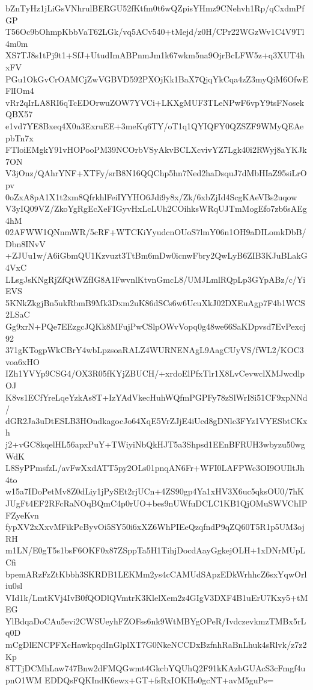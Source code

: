 bZnTyHz1jLiGsVNhrulBERGU52fKtfm0t6wQZpisYHmz9CNehvh1Rp/qCxdmPfGP
T56Oc9bOhmpKbbVaT62LGk/vq5ACv540+tMejd/z0H/CPr22WGzWv1C4V9Tl4m0m
XS7TJ8s1tPj9t1+SfJ+UtudImABPnmJm1k67wkm5na9OjrBcLFW5z+q3XUT4hxFV
PGu1OkGvCrOAMCjZwVGBVD592PXOjKk1BaX7QjqYkCqa4zZ3myQiM6OfwEFlIOm4
vRr2qIrLA8RI6qTcEDOrwuZOW7YVCi+LKXgMUF3TLeNPwF6vpY9tsFNosekQBX57
e1vd7YE8Bxeq4X0n3ExruEE+3meKq6TY/oT1q1QYIQFY0QZSZF9WMyQEAepbTn7x
FTloiEMgkY91vHOPooPM39NCOrbVSyAkvBCLXcvivYZ7Lgk40i2RWyj8aYKJk7ON
V3jOnz/QAhrYNF+XTFy/srB8N16QQChp5hn7Ned2haDsquJ7dMbHIaZ95siLrOpv
0oZxA8pA1X1t2xm8QfrkhlFeiIYYHO6Jdi9y8x/Zk/6xbZjId4ScgKAeVBs2uqow
V3yIQ09VZ/ZkoYgRgEcXeFIGyvHxLcLUh2COihksWRqUJTmMogEfo7zb6sAEg4hM
02AFWW1QNnmWR/5cRF+WTCKiYyudcnOUoS7lmY06n1OH9aDILomkDbB/Dbn8INvV
+ZJUu1w/A6iGbmQU1Kzvuzt3TtBm6mDw0icnwFbry2QwLyB6ZIB3KJuBLakG4VxC
LLsgJsKNgRjZfQtWZfIG8A1FwvnlKtvnGmcL8/UMJLmlRQpLp3GYpABz/c/YiEVS
5KNkZkgjBn5ukRbmB9Mk3Dxm2uK86dSCs6w6UcuXkJ02DXEuAgp7F4b1WCS2LSaC
Gg9xrN+PQe7EEzgcJQKk8MFujPwCSlpOWvVopq0g48we66SaKDpvsd7EvPexcj92
371gKTogpWkCBrY4wbLpzsoaRALZ4WURNENAgL9AagCUyVS/fWL2/KOC3voa6xHO
IZh1YVYp9CSG4/OX3R05fKYjZBUCH/+xrdoElPfxTlr1X8LvCevwclXMJwcdlpOJ
K8vs1ECfYreLqeYzkAs8T+IzYAdVkecHuhWQfmPGPFy78zSlWrI8i51CF9xpNNd/
dGR2Ja3uDtESLB3HOndkagocJo64XqE5VrZJjE4iUcd8gDNlc3FYz1VYESbtCKxh
j2+vGC8kqelHL56apxPuY+TWiyiNbQkHJT5a3Shpsd1EEnBFRUH3wbyzu50wgWdK
L8SyPPmsfzL/avFwXxdATT5py2OLs01pnqAN6Fr+WFI0LAFPWc3OI9OUIltJh4to
w15a7IDoPetMv8Z0dLiy1jPySEt2rjUCn+4ZS90gp4Ya1xHV3X6uc5qksOU0/7hK
JUgFt4EF2RFcRaNOqBQmC4p0rUO+bes9nUWfuDCLC1KB1QjOMuSWVChIPFZyeKvn
fypXV2xXxvMFikPcByvOi5SY50i6xXZ6WhPIEeQzqfndP9qZQ60T5R1p5UM3ojRH
m1LN/E0gT5s1bsF6OKF0x87ZSppTa5H1TihjDocdAayGgkejOLH+1xDNrMUpLCfi
bpemARzFzZtKbbh3SKRDB1LEKMm2ys4cCAMUdSApzEDkWrhhcZ6sxYqwOrliu0sl
VId1k/LmtKVj4IvB0fQODlQVmtrK3KlelXem2z4GIgV3DXF4B1uErU7Kxy5+tMEG
YlBdqaDoCAu5evi2CWSUeyhFZOFss6nk9WtMBYgOPeR/IvdczevkmzTMBx5rLq0D
mCgDlENCPFXcHawkpqdInGlplXT7G0NkeNCCDxBzfnhRaBnLhuk4sRlvk/z7z2Kp
8TTjDCMhLaw747Bnw2dFMQGwmt4GkcbYQUhQ2F91kKAzbGUAcS3cFmgf4upnO1WM
EDDQsFQKIndK6ewx+GT+fsRxIOKHo0gcNT+avM5guPs=
